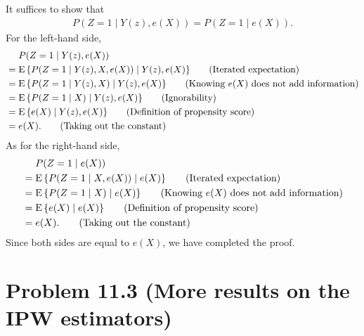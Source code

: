 \documentclass[10pt]{article}
\begin{document}
It suffices to show that
\begin{align*}
  P(Z = 1 \mid Y(z), e(X)) = P(Z = 1 \mid e(X)).
\end{align*}
For the left-hand side,
\begin{align*}
  &\mathrel{\phantom{=}} P(Z = 1 \mid Y(z), e(X)) \\
  &= \operatorname{E}{\left\lbrace P(Z = 1 \mid Y(z), X, e(X)) \mid Y(z), e(X) \right\rbrace} \tag{Iterated expectation} \\
  &= \operatorname{E}{\left\lbrace P(Z = 1 \mid Y(z), X) \mid Y(z), e(X) \right\rbrace} \tag{Knowing $e(X)$ does not add information} \\
  &= \operatorname{E}{\left\lbrace P(Z = 1 \mid X) \mid Y(z), e(X) \right\rbrace} \tag{Ignorability} \\
  &= \operatorname{E}{\left\lbrace e(X) \mid Y(z), e(X) \right\rbrace} \tag{Definition of propensity score} \\
  &= e(X). \tag{Taking out the constant}
\end{align*}
As for the right-hand side,
\begin{align*}
  &\mathrel{\phantom{=}} P(Z = 1 \mid e(X)) \\
  &= \operatorname{E}{\left\lbrace P(Z = 1 \mid X, e(X)) \mid e(X) \right\rbrace} \tag{Iterated expectation} \\
  &= \operatorname{E}{\left\lbrace P(Z = 1 \mid X) \mid e(X) \right\rbrace} \tag{Knowing $e(X)$ does not add information} \\
  &= \operatorname{E}{\left\lbrace e(X) \mid e(X) \right\rbrace} \tag{Definition of propensity score} \\
  &= e(X). \tag{Taking out the constant}
\end{align*}
Since both sides are equal to $e(X)$,
we have completed the proof.

\section*{Problem 11.3 (More results on the IPW estimators)}
\end{document}
